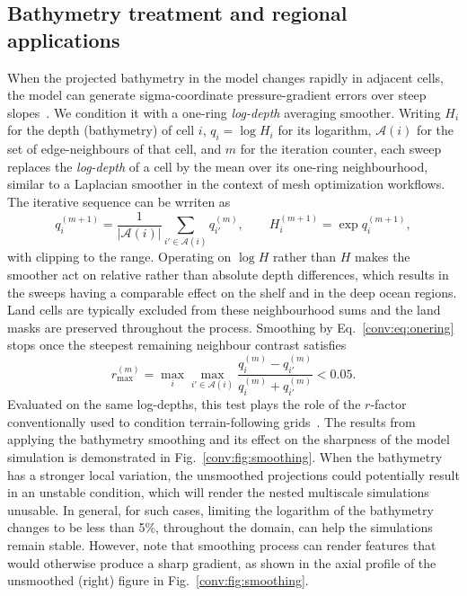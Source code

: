 \subsection{Bathymetry treatment and regional applications}\label{conv:sec:bathysmooth}
When the projected bathymetry in the \ROMS model changes rapidly in adjacent cells, the model can generate sigma-coordinate pressure-gradient errors over steep slopes~\citep{haney1991pressure,mellor1994pressure}. We condition it with a one-ring \emph{log-depth} averaging smoother. Writing $H_i$ for the depth (bathymetry) of \ROMS cell $i$, $q_i=\log H_i$ for its logarithm, $\mathcal{A}(i)$ for the set of edge-neighbours of that cell, and $m$ for the iteration counter, each sweep replaces the \emph{log-depth} of a cell by the mean over its one-ring neighbourhood, similar to a Laplacian smoother in the context of mesh optimization workflows. The iterative sequence can be wrriten as 
%
\begin{equation}
 q_i^{(m+1)}=\frac{1}{|\mathcal{A}(i)|}\sum_{i'\in\mathcal{A}(i)}q_{i'}^{(m)},\qquad H_i^{(m+1)}=\exp q_i^{(m+1)},
 \label{conv:eq:onering}
\end{equation}
with clipping to the \MPAS range. Operating on $\log H$ rather than $H$ makes the smoother act on relative rather than absolute depth differences, which results in the sweeps having a comparable effect on the shelf and in the deep ocean regions. Land cells are typically excluded from these neighbourhood sums and the land masks are preserved throughout the process. Smoothing by Eq.~\eqref{conv:eq:onering} stops once the steepest remaining neighbour contrast satisfies
\begin{equation}
 r_{\max}^{(m)}=\max_i\max_{i'\in\mathcal{A}(i)}\frac{q_i^{(m)}-q_{i'}^{(m)}}{q_i^{(m)}+q_{i'}^{(m)}}<0.05.
 \label{conv:eq:slope-stop}
\end{equation}
Evaluated on the same log-depths, this test plays the role of the $r$-factor conventionally used to condition terrain-following grids~\citep{sikiric2009smoothing}. The results from applying the bathymetry smoothing and its effect on the sharpness of the \ROMS model simulation is demonstrated in Fig.~\ref{conv:fig:smoothing}. When the bathymetry has a stronger local variation, the unsmoothed projections could potentially result in an unstable condition, which will render the nested multiscale simulations unusable. In general, for such cases, limiting the logarithm of the bathymetry changes to be less than 5\%, throughout the domain, can help the \ROMS simulations remain stable. However, note that smoothing process can render features that would otherwise produce a sharp gradient, as shown in the axial profile of the unsmoothed (right) figure in  Fig.~\ref{conv:fig:smoothing}.

